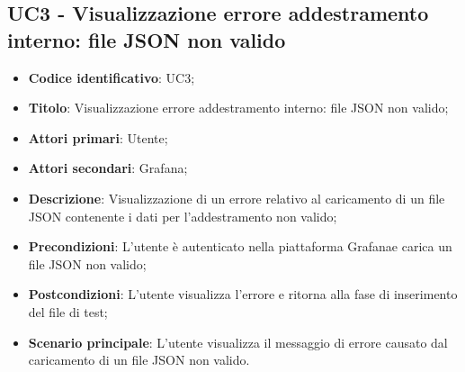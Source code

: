 \subsection{UC3 - Visualizzazione errore addestramento interno: file JSON non valido}
\begin{itemize}
	\item \textbf{Codice identificativo}: UC3;
	\item \textbf{Titolo}: Visualizzazione errore addestramento interno: file JSON non valido;
	\item \textbf{Attori primari}: Utente;
	\item \textbf{Attori secondari}: Grafana\glo;
	\item \textbf{Descrizione}: Visualizzazione di un errore relativo al caricamento di un file JSON contenente i dati per l'addestramento non valido;
	\item \textbf{Precondizioni}: L'utente è autenticato nella piattaforma Grafana\glosp e carica un file JSON non valido;
	\item \textbf{Postcondizioni}: L'utente visualizza l'errore e ritorna alla fase di inserimento del file di test;	
	\item \textbf{Scenario principale}: L'utente visualizza il messaggio di errore causato dal caricamento di un file JSON non valido.	
\end{itemize}
